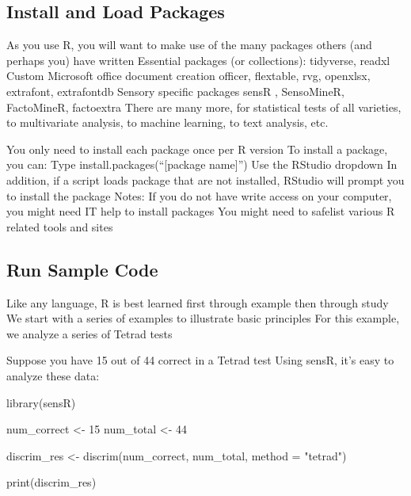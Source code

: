 \documentclass[
]{book}
\newenvironment{Shaded}{\begin{snugshade}}{\end{snugshade}}
\newcommand{\AttributeTok}[1]{\textcolor[rgb]{0.77,0.63,0.00}{#1}}
\newcommand{\DecValTok}[1]{\textcolor[rgb]{0.00,0.00,0.81}{#1}}
\newcommand{\FunctionTok}[1]{\textcolor[rgb]{0.00,0.00,0.00}{#1}}
\newcommand{\NormalTok}[1]{#1}
\newcommand{\OtherTok}[1]{\textcolor[rgb]{0.56,0.35,0.01}{#1}}
\newcommand{\StringTok}[1]{\textcolor[rgb]{0.31,0.60,0.02}{#1}}
\begin{document}
\hypertarget{install-and-load-packages}{%
\subsection{Install and Load Packages}\label{install-and-load-packages}}

As you use R, you will want to make use of the many packages others (and perhaps you) have written
Essential packages (or collections):
tidyverse, readxl
Custom Microsoft office document creation
officer, flextable, rvg, openxlsx, extrafont, extrafontdb
Sensory specific packages
sensR , SensoMineR, FactoMineR, factoextra
There are many more, for statistical tests of all varieties, to multivariate analysis, to machine learning, to text analysis, etc.

You only need to install each package once per R version
To install a package, you can:
Type install.packages(``{[}package name{]}'')
Use the RStudio dropdown
In addition, if a script loads package that are not installed, RStudio will prompt you to install the package
Notes:
If you do not have write access on your computer, you might need IT help to install packages
You might need to safelist various R related tools and sites

\hypertarget{run-sample-code}{%
\subsection{Run Sample Code}\label{run-sample-code}}

Like any language, R is best learned first through example then through study
We start with a series of examples to illustrate basic principles
For this example, we analyze a series of Tetrad tests

Suppose you have 15 out of 44 correct in a Tetrad test
Using sensR, it's easy to analyze these data:

\begin{Shaded}
\begin{Highlighting}[]
\FunctionTok{library}\NormalTok{(sensR)}

\NormalTok{num\_correct }\OtherTok{\textless{}{-}} \DecValTok{15}  
\NormalTok{num\_total }\OtherTok{\textless{}{-}} \DecValTok{44}  
  
\NormalTok{discrim\_res }\OtherTok{\textless{}{-}} \FunctionTok{discrim}\NormalTok{(num\_correct, num\_total, }\AttributeTok{method =} \StringTok{"tetrad"}\NormalTok{)  }
  
\FunctionTok{print}\NormalTok{(discrim\_res)  }
\end{Highlighting}
\end{Shaded}
\end{document}
